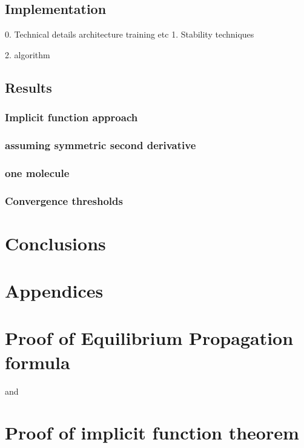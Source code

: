 \documentclass[a4paper,10pt]{report}
\begin{document}
\subsection{ Implementation}
0. Technical details
    architecture
    training
    etc
1. Stability techniques

2. algorithm
\subsection{Results}
\subsubsection{Implicit function approach}
\subsubsection{assuming symmetric second derivative}
\subsubsection{one molecule}
\subsubsection{Convergence thresholds}
\section{Conclusions}

\nocite{*}




\section{Appendices}
\appendix
\section{Proof of Equilibrium Propagation formula}
and

\appendix
\section{Proof of implicit function theorem}
\end{document}
